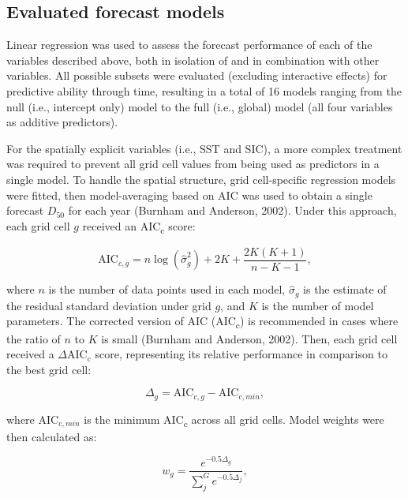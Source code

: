 \documentclass[12pt,]{book}
\theoremstyle{definition}
\theoremstyle{definition}
\theoremstyle{definition}
\theoremstyle{remark}
\begin{document}
\subsection{Evaluated forecast models}\label{rtf-models}

\noindent
Linear regression was used to assess the forecast performance of each of
the variables described above, both in isolation of and in combination
with other variables. All possible subsets were evaluated (excluding
interactive effects) for predictive ability through time, resulting in a
total of 16 models ranging from the null (i.e., intercept only) model to
the full (i.e., global) model (all four variables as additive
predictors).

For the spatially explicit variables (i.e., SST and SIC), a more complex
treatment was required to prevent all grid cell values from being used
as predictors in a single model. To handle the spatial structure, grid
cell-specific regression models were fitted, then model-averaging based
on AIC was used to obtain a single forecast \(D_{50}\) for each year
(Burnham and Anderson, 2002). Under this approach, each grid cell \(g\)
received an AIC\textsubscript{c} score:

\begin{equation}
  \text{AIC}_{c,g}=n \log{\left(\hat{\sigma}_g^2\right) + 2K + \frac{2K(K+1)}{n-K-1}},
  \label{eq:aicc}
\end{equation}

\noindent
where \(n\) is the number of data points used in each model,
\(\hat{\sigma}_g\) is the estimate of the residual standard deviation
under grid \(g\), and \(K\) is the number of model parameters. The
corrected version of AIC (AIC\textsubscript{c}) is recommended in cases
where the ratio of \(n\) to \(K\) is small (Burnham and Anderson, 2002).
Then, each grid cell received a \(\Delta\text{AIC}_\text{c}\) score,
representing its relative performance in comparison to the best grid
cell:

\begin{equation}
  \Delta_g=\text{AIC}_{\text{c},g}-\text{AIC}_{\text{c},min},
  \label{eq:delta-aicc}
\end{equation}

\noindent
where \(\text{AIC}_{\text{c},min}\) is the minimum AIC\textsubscript{c}
across all grid cells. Model weights were then calculated as:

\begin{equation}
  w_g=\frac{e^{-0.5\Delta_g}}{\sum_j^G e^{-0.5\Delta_j}},
\label{eq:aicc-weights}
\end{equation}
\end{document}
